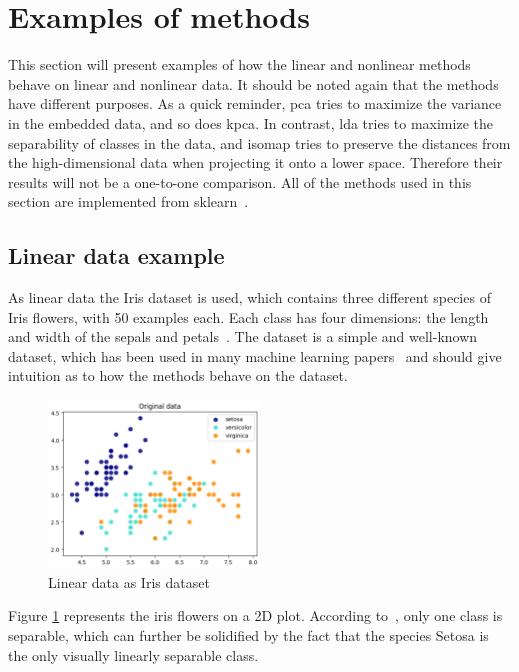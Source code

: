 \section{Examples of methods}\label{sec:examples-methods}
This section will present examples of how the linear and nonlinear methods behave on linear and nonlinear data. It should be noted again that the methods have different purposes. As a quick reminder, \gls{pca} tries to maximize the variance in the embedded data, and so does \gls{kpca}. In contrast, \gls{lda} tries to maximize the separability of classes in the data, and \gls{isomap} tries to preserve the distances from the high-dimensional data when projecting it onto a lower space. Therefore their results will not be a one-to-one comparison. All of the methods used in this section are implemented from \gls{sklearn}~\cite{scikit-learn}.

\subsection{Linear data example}\label{subsec:linear-data-example}
As linear data the Iris dataset is used, which contains three different species of Iris flowers, with 50 examples each. Each class has four dimensions: the length and width of the sepals and petals~\cite{iris-dataset}. The dataset is a simple and well-known dataset, which has been used in many machine learning papers~\cite{iris-dataset} and should give intuition as to how the methods behave on the dataset.

\begin{figure}[htb!]
    \centering
    \includegraphics[width=0.5\textwidth]{figures/theory-example-figures/linear-data.png}
    \caption{Linear data as Iris dataset}
    \label{fig:linear-data}
\end{figure}

Figure \ref{fig:linear-data} represents the iris flowers on a 2D plot. According to~\cite{iris-dataset}, only one class is separable, which can further be solidified by the fact that the species Setosa is the only visually linearly separable class.

